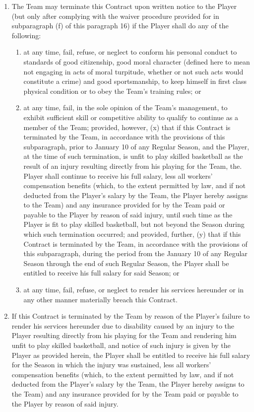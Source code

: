 \documentclass[
]{book}
\providecommand{\tightlist}{%
  \setlength{\itemsep}{0pt}\setlength{\parskip}{0pt}}
\begin{document}
\begin{enumerate}
  \begin{enumerate}
  \def\labelenumii{(\alph{enumii})}
  \tightlist
  \item
    The Team may terminate this Contract upon written notice to the Player (but only after complying with the waiver procedure provided for in subparagraph (f) of this paragraph 16) if the Player shall do any of the following:

    \begin{enumerate}
    \def\labelenumiii{(\roman{enumiii})}
    \tightlist
    \item
      at any time, fail, refuse, or neglect to conform his personal conduct to standards of good citizenship, good moral character (defined here to mean not engaging in acts of moral turpitude, whether or not such acts would constitute a crime) and good sportsmanship, to keep himself in first class physical condition or to obey the Team's training rules; or
    \item
      at any time, fail, in the sole opinion of the Team's management, to exhibit sufficient skill or competitive ability to qualify to continue as a member of the Team; provided, however, (x) that if this Contract is terminated by the Team, in accordance with the provisions of this subparagraph, prior to January 10 of any Regular Season, and the Player, at the time of such termination, is unfit to play skilled basketball as the result of an injury resulting directly from his playing for the Team, the. Player shall continue to receive his full salary, less all workers' compensation benefits (which, to the extent permitted by law, and if not deducted from the Player's salary by the Team, the Player hereby assigns to the Team) and any insurance provided for by the Team paid or payable to the Player by reason of said injury, until such time as the Player is fit to play skilled basketball, but not beyond the Season during which such termination occurred; and provided, further, (y) that if this Contract is terminated by the Team, in accordance with the provisions of this subparagraph, during the period from the January 10 of any Regular Season through the end of such Regular Season, the Player shall be entitled to receive his full salary for said Season; or
    \item
      at any time, fail, refuse, or neglect to render his services hereunder or in any other manner materially breach this Contract.
    \end{enumerate}
  \item
    If this Contract is terminated by the Team by reason of the Player's failure to render his services hereunder due to disability caused by an injury to the Player resulting directly from his playing for the Team and rendering him unfit to play skilled basketball, and notice of such injury is given by the Player as provided herein, the Player shall be entitled to receive his full salary for the Season in which the injury was sustained, less all workers' compensation benefits (which, to the extent permitted by law, and if not deducted from the Player's salary by the Team, the Player hereby assigns to the Team) and any insurance provided for by the Team paid or payable to the Player by reason of said injury.

\end{enumerate}
\end{enumerate}
\end{document}
